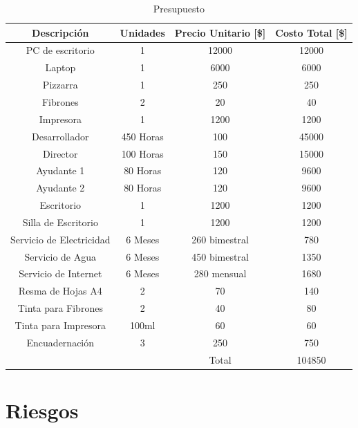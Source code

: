 %
\begin{table}[h]
\small
\label{tabla:presupuesto}
\caption{Presupuesto}
\begin{tabular}{|c|c|c|c|}
\hline 
\textbf{Descripción} & \textbf{Unidades} & \textbf{Precio Unitario} [\$] & \textbf{Costo Total} [\$] \\ \hline 
PC de escritorio & 1 & 12000 & 12000 \\ %
Laptop & 1 & 6000 & 6000 \\ %
Pizzarra & 1 & 250 & 250 \\ %
Fibrones & 2 & 20 & 40 \\ %
Impresora & 1 & 1200 & 1200 \\ %
Desarrollador & 450 Horas & 100 & 45000 \\ %
Director & 100 Horas & 150 & 15000 \\ %
Ayudante 1 & 80 Horas & 120 & 9600 \\ %
Ayudante 2 & 80 Horas & 120 & 9600 \\ %
Escritorio & 1 & 1200 & 1200 \\ %
Silla de Escritorio & 1 & 1200 & 1200 \\ %
Servicio de Electricidad & 6 Meses & 260 bimestral & 780 \\ %
Servicio de Agua & 6 Meses & 450 bimestral & 1350 \\ %
Servicio de Internet & 6 Meses & 280 mensual & 1680 \\ %
Resma de Hojas A4 & 2 & 70 & 140 \\ %
Tinta para Fibrones & 2 & 40 & 80 \\ %
Tinta para Impresora & 100ml & 60 & 60 \\ %
Encuadernación & 3 & 250 & 750 \\ \hline
 & & Total & 104850\\ \hline
\end{tabular} 
\end{table}
\section{Riesgos}

